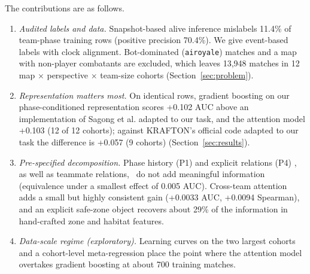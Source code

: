 The contributions are as follows.
\begin{enumerate}
\item \emph{Audited labels and data.} Snapshot-based alive inference mislabels 11.4\% of team-phase training rows (positive precision 70.4\%). We give event-based labels with clock alignment. Bot-dominated (\texttt{airoyale}) matches and a map with non-player combatants are excluded, which leaves 13,948 matches in 12 map $\times$ perspective $\times$ team-size cohorts (Section~\ref{sec:problem}).
\item \emph{Representation matters most.} On identical rows, gradient boosting on our phase-conditioned representation scores +0.102 AUC above an implementation of Sagong et al. adapted to our task, and the attention model +0.103 (12 of 12 cohorts); against KRAFTON's official code adapted to our task the difference is +0.057 (9 cohorts)  (Section~\ref{sec:results}).
\item \emph{Pre-specified decomposition.} Phase history (P1) and explicit relations (P4)%
, as well as teammate relations,%
\ do not add meaningful information (equivalence under a smallest effect of 0.005 AUC). Cross-team attention adds a small but highly consistent gain (+0.0033 AUC, +0.0094 Spearman), and an explicit safe-zone object recovers about 29\% of the information in hand-crafted zone and habitat features.
\item \emph{Data-scale regime (exploratory).} Learning curves on the two largest cohorts and a cohort-level meta-regression place the point where the attention model overtakes gradient boosting at about 700 training matches.
\end{enumerate}
